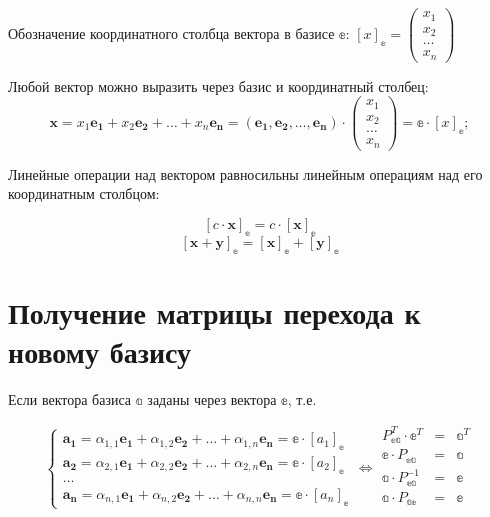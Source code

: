 Обозначение координатного столбца вектора в базисе $\mathbb{e}$: $[x]_\mathbb{e} = 
\begin{pmatrix}
	x_1\\
	x_2\\
	\dots\\
	x_n
\end{pmatrix} $  

Любой вектор можно выразить через базис и координатный столбец: 
$$
	\boldsymbol{x} = x_1\boldsymbol{e_1} + x_2\boldsymbol{e_2} + \dots + x_n\boldsymbol{e_n} = (\boldsymbol{e_1}, \boldsymbol{e_2}, \dots, \boldsymbol{e_n}) \cdot 
	\begin{pmatrix}
		x_1\\
		x_2\\
		\dots\\
		x_n
	\end{pmatrix} = \mathbb{e}\cdot [x]_\mathbb{e}; 
$$

Линейные операции над вектором равносильны линейным операциям над его координатным столбцом:

$$ [c\cdot \boldsymbol{x}]_\mathbb{e} = c\cdot [\boldsymbol{x}]_\mathbb{e} $$
$$ [\boldsymbol{x} + \boldsymbol{y}]_\mathbb{e} = [\boldsymbol{x}]_\mathbb{e} + [\boldsymbol{y}]_\mathbb{e} $$

\section{Получение матрицы перехода к новому базису}

Если вектора базиса $\mathbb{a}$ заданы через вектора $\mathbb{e}$, т.е.

\begin{equation*} 
	\begin{cases}
		\boldsymbol{a_1} = \alpha_{1,1}\boldsymbol{e_1} + \alpha_{1,2}\boldsymbol{e_2} + \dots + \alpha_{1,n}\boldsymbol{e_n} = \mathbb{e} \cdot [a_1]_\mathbb{e} \\
		\boldsymbol{a_2} = \alpha_{2,1}\boldsymbol{e_1} + \alpha_{2,2}\boldsymbol{e_2} + \dots + \alpha_{2,n}\boldsymbol{e_n} = \mathbb{e} \cdot [a_2]_\mathbb{e} \\
		\dots \\
		\boldsymbol{a_n} = \alpha_{n,1}\boldsymbol{e_1} + \alpha_{n,2}\boldsymbol{e_2} + \dots + \alpha_{n,n}\boldsymbol{e_n} = \mathbb{e} \cdot [a_n]_\mathbb{e}
	\end{cases}
	\Leftrightarrow
	\begin{matrix}
		P_\mathbb{ea}^T \cdot \mathbb{e}^T& =& \mathbb{a}^T \\
		\mathbb{e} \cdot P_\mathbb{ea}& =& \mathbb{a}\\
		\mathbb{a} \cdot P_\mathbb{ea}^{-1}& =& \mathbb{e}\\
		\mathbb{a} \cdot P_\mathbb{ae}& =& \mathbb{e}\\
	\end{matrix}
\end{equation*} 

